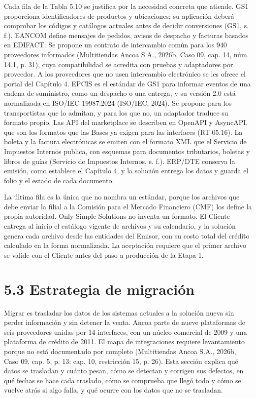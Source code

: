 \documentclass[11pt]{article}
\begin{document}
Cada fila de la Tabla 5.10 se justifica por la necesidad concreta que atiende. GS1 proporciona identificadores de productos y ubicaciones; su aplicación deberá comprobar los códigos y catálogos actuales antes de decidir conversiones (GS1, s. f.). EANCOM define mensajes de pedidos, avisos de despacho y facturas basados en EDIFACT. Se propone un contrato de intercambio común para los 940 proveedores informados (Multitiendas Ancoa S.A., 2026b, Caso 09, cap. 14, núm. 14.1, p. 31), cuya compatibilidad se acredita con pruebas y adaptadores por proveedor. A los proveedores que no usen intercambio electrónico se les ofrece el portal del Capítulo 4. EPCIS es el estándar de GS1 para informar eventos de una cadena de suministro, como un despacho o una entrega, y su versión 2.0 está normalizada en ISO/IEC 19987:2024 (ISO/IEC, 2024). Se propone para los transportistas que lo admitan, y para los que no, un adaptador traduce su formato propio. Las API del marketplace se describen en OpenAPI y AsyncAPI, que son los formatos que las Bases ya exigen para las interfaces (RT-05.16). La boleta y la factura electrónicas se emiten con el formato XML que el Servicio de Impuestos Internos publica, con esquemas para documentos tributarios, boletas y libros de guías (Servicio de Impuestos Internos, s. f.). ERP/DTE conserva la emisión, como establece el Capítulo 4, y la solución entrega los datos y guarda el folio y el estado de cada documento.

La última fila es la única que no nombra un estándar, porque los archivos que debe enviar la filial a la Comisión para el Mercado Financiero (CMF) los define la propia autoridad. Only Simple Solutions no inventa un formato. El Cliente entrega al inicio el catálogo vigente de archivos y su calendario, y la solución genera cada archivo desde las entidades del Emisor, con su costo total del crédito calculado en la forma normalizada. La aceptación requiere que el primer archivo se valide con el Cliente antes del paso a producción de la Etapa 1.


\section{5.3 Estrategia de migración}

Migrar es trasladar los datos de los sistemas actuales a la solución nueva sin perder información y sin detener la venta. Ancoa parte de nueve plataformas de seis proveedores unidas por 14 interfaces, con un núcleo comercial de 2009 y una plataforma de crédito de 2011. El mapa de integraciones requiere levantamiento porque no está documentado por completo (Multitiendas Ancoa S.A., 2026b, Caso 09, cap. 5, p. 13; cap. 10, restricción 15, p. 26). Esta sección explica qué datos se trasladan y cuánto pesan, cómo se detectan y corrigen sus defectos, en qué fechas se hace cada traslado, cómo se comprueba que llegó todo y cómo se vuelve atrás si algo falla, y qué ocurre con los datos que no se trasladan.
\end{document}
